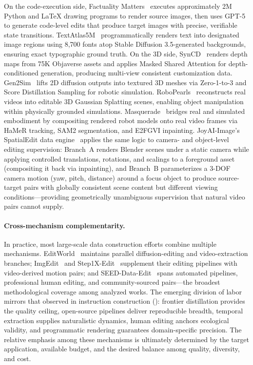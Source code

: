 \documentclass{llmxive}
\begin{document}
On the code-execution side, Factuality Matters~\citep{zhuo2025factuality} executes approximately 2M Python and \LaTeX{} drawing programs to render source images, then uses GPT-5 to generate code-level edits that produce target images with precise, verifiable state transitions. TextAtlas5M~\citep{wang2025textatlas5m} programmatically renders text into designated image regions using 8,700 fonts atop Stable Diffusion 3.5-generated backgrounds, ensuring exact typographic ground truth. On the 3D side, SynCD~\citep{kumari2025generating} renders depth maps from 75K Objaverse assets and applies Masked Shared Attention for depth-conditioned generation, producing multi-view consistent customization data. Gen2Sim~\citep{katara2024gen2sim} lifts 2D diffusion outputs into textured 3D meshes via Zero-1-to-3 and Score Distillation Sampling for robotic simulation. RoboPearls~\citep{tao2025robopearls} reconstructs real videos into editable 3D Gaussian Splatting scenes, enabling object manipulation within physically grounded simulations. Masquerade~\citep{lepert2025masquerade} bridges real and simulated embodiment by compositing rendered robot models onto real video frames via HaMeR tracking, SAM2 segmentation, and E2FGVI inpainting. JoyAI-Image's SpatialEdit data engine~\citep{jdjoyaiimage} applies the same logic to camera- and object-level editing supervision: Branch~A renders Blender scenes under a static camera while applying controlled translations, rotations, and scalings to a foreground asset (compositing it back via inpainting), and Branch~B parameterizes a 3-DOF camera motion (yaw, pitch, distance) around a focus object to produce source-target pairs with globally consistent scene content but different viewing conditions---providing geometrically unambiguous supervision that natural video pairs cannot supply.

\paragraph{Cross-mechanism complementarity.}
In practice, most large-scale data construction efforts combine multiple mechanisms. EditWorld~\citep{zeng2025editworld} maintains parallel diffusion-editing and video-extraction branches; ImgEdit~\citep{ye2025imgedit} and Step1X-Edit~\citep{liu2025step1x} supplement their editing pipelines with video-derived motion pairs; and SEED-Data-Edit~\citep{ge2024seed} spans automated pipelines, professional human editing, and community-sourced pairs---the broadest methodological coverage among analyzed works. The emerging division of labor mirrors that observed in instruction construction (): frontier distillation provides the quality ceiling, open-source pipelines deliver reproducible breadth, temporal extraction supplies naturalistic dynamics, human editing anchors ecological validity, and programmatic rendering guarantees domain-specific precision. The relative emphasis among these mechanisms is ultimately determined by the target application, available budget, and the desired balance among quality, diversity, and cost.
\end{document}
